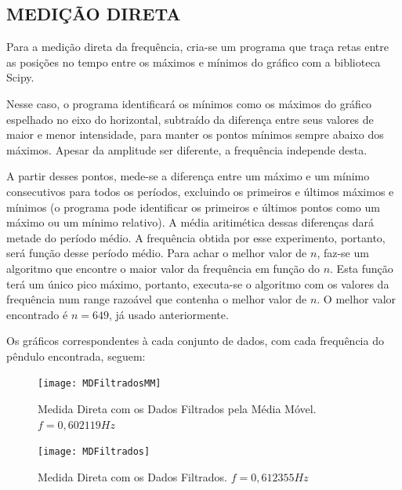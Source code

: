 \documentclass[10pt,a4paper,twocolumn]{article}
\begin{document}
\subsection{MEDIÇÃO DIRETA}
Para a medição direta da frequência, cria-se um programa que traça retas entre as posições no tempo entre os máximos e mínimos do gráfico com a biblioteca Scipy.
\par Nesse caso, o programa identificará os mínimos como os máximos do gráfico espelhado no eixo do horizontal, subtraído da diferença entre seus valores de maior e menor intensidade, para manter os pontos mínimos sempre abaixo dos máximos. Apesar da amplitude ser diferente, a frequência independe desta.
\par A partir desses pontos, mede-se a diferença entre um máximo e um mínimo consecutivos para todos os períodos, excluindo os primeiros e últimos máximos e mínimos (o programa pode identificar os primeiros e últimos pontos como um máximo ou um mínimo relativo). A média aritimética dessas diferenças dará metade do período médio. A frequência obtida por esse experimento, portanto, será função desse período médio.
Para achar o melhor valor de $n$, faz-se um algoritmo que encontre o maior valor da frequência em função do $n$. Esta função terá um único pico máximo, portanto, executa-se o algoritmo com os valores da frequência num range razoável que contenha o melhor valor de $n$. O melhor valor encontrado é $n=649$, já usado anteriormente.
\par Os gráficos correspondentes à cada conjunto de dados, com cada frequência do pêndulo encontrada, seguem:
\begin{figure}[H]
\texttt{[image: MDFiltradosMM]}
\caption{Medida Direta com os Dados Filtrados pela Média Móvel. $f=0,602119 Hz$ \centering}
\label{fig:mdfiltradosmm}
\end{figure}
\begin{figure}[H]
\texttt{[image: MDFiltrados]}
\caption{Medida Direta com os Dados Filtrados.
 $f=0,612355 Hz$ \centering}
\label{fig:mdfiltrados}
\end{figure}
\end{document}
